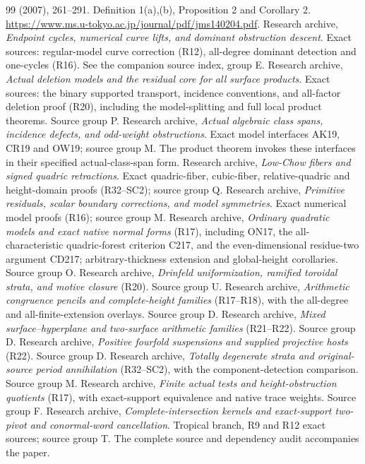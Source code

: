\documentclass[11pt,a4paper]{article}
\theoremstyle{definition}
\theoremstyle{remark}\newtheorem{remark}[theorem]{Remark}
\numberwithin{equation}{section}
\begin{document}
\begin{thebibliography}{99}
(2007), 261--291. Definition 1(a),(b), Proposition 2 and Corollary 2.
\url{https://www.ms.u-tokyo.ac.jp/journal/pdf/jms140204.pdf}.
 Research archive,
\emph{Endpoint cycles, numerical curve lifts, and dominant
obstruction descent}. Exact sources: regular-model curve correction
(R12), all-degree dominant detection and one-cycles (R16).
See the companion source index, group E.
 Research archive,
\emph{Actual deletion models and the residual core for all surface
products}. Exact sources: the binary supported transport, incidence
conventions, and all-factor deletion proof (R20), including the
model-splitting and full local product theorems. Source group P.
 Research archive,
\emph{Actual algebraic class spans, incidence defects, and odd-weight
obstructions}. Exact model interfaces AK19, CR19 and OW19;
source group M. The product theorem invokes these interfaces in
their specified actual-class-span form.
 Research archive,
\emph{Low-Chow fibers and signed quadric retractions}. Exact
quadric-fiber, cubic-fiber, relative-quadric and height-domain
proofs (R32--SC2); source group Q.
 Research archive,
\emph{Primitive residuals, scalar boundary corrections, and model
symmetries}. Exact numerical model proofs (R16); source group M.
 Research archive,
\emph{Ordinary quadratic models and exact native normal forms}
(R17), including ON17, the all-characteristic quadric-forest criterion
C217, and the even-dimensional residue-two argument CD217;
arbitrary-thickness extension and global-height
corollaries. Source group O.
 Research archive,
\emph{Drinfeld uniformization, ramified toroidal strata, and motive
closure} (R20). Source group U.
 Research archive,
\emph{Arithmetic congruence pencils and complete-height families}
(R17--R18), with the all-degree and all-finite-extension overlays.
Source group D.
 Research archive,
\emph{Mixed surface--hyperplane and two-surface arithmetic
families} (R21--R22). Source group D.
 Research archive,
\emph{Positive fourfold suspensions and supplied projective hosts}
(R22). Source group D.
 Research archive,
\emph{Totally degenerate strata and original-source period
annihilation} (R32--SC2), with the component-detection comparison.
Source group M.
 Research archive,
\emph{Finite actual tests and height-obstruction quotients}
(R17), with exact-support equivalence and native trace weights.
Source group F.
 Research archive,
\emph{Complete-intersection kernels and exact-support
two-pivot and conormal-word cancellation}. Tropical branch,
R9 and R12 exact sources; source group T. The complete source
and dependency audit accompanies the paper.



\end{thebibliography}
\end{document}
